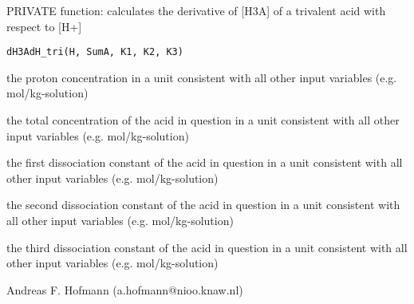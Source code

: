 \documentclass{article}
\begin{document}
\begin{Description}\relax
PRIVATE function: calculates the derivative of [H3A] of a trivalent acid with respect to [H+]
\end{Description}
\begin{Usage}
\begin{verbatim}dH3AdH_tri(H, SumA, K1, K2, K3)\end{verbatim}
\end{Usage}
\begin{Arguments}
\begin{ldescription}
\item[\code{H }] the proton concentration in a unit consistent with all other input variables (e.g. mol/kg-solution)
\item[\code{SumA }] the total concentration of the acid in question in a unit consistent with all other input variables (e.g. mol/kg-solution)
\item[\code{K1 }] the first dissociation constant of the acid in question in a unit consistent with all other input variables (e.g. mol/kg-solution)
\item[\code{K2 }] the second dissociation constant of the acid in question in a unit consistent with all other input variables (e.g. mol/kg-solution)
\item[\code{K3 }] the third dissociation constant of the acid in question in a unit consistent with all other input variables (e.g. mol/kg-solution)
\end{ldescription}
\end{Arguments}
\begin{Author}\relax
Andreas F. Hofmann (a.hofmann@nioo.knaw.nl)
\end{Author}
\end{document}
